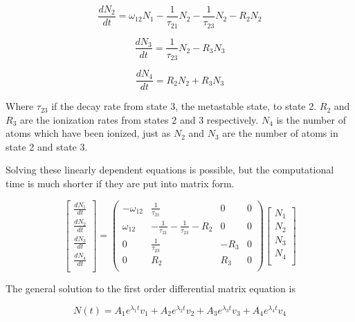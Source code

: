\documentclass[prb,preprint]{revtex4-1}
\begin{document}
\begin{equation}
\label{RateEq2}
\frac{dN_2}{dt} = \omega_{12}N_1 -  \frac{1}{\tau_{21}}N_2 - \frac{1}{\tau_{23}}N_2 - R_2N_2
\end{equation}

\begin{equation}
\label{RateEq3}
\frac{dN_3}{dt} =  \frac{1}{\tau_{23}}N_2 - R_3N_3
\end{equation}

\begin{equation}
\label{RateEq4}
\frac{dN_4}{dt} = R_2N_2 + R_3N_3
\end{equation}

Where $\tau_{23}$ if the decay rate from state 3, the metastable state, to state 2. $R_2$ and $R_3$ are the ionization rates from states 2 and 3 respectively. $N_4$ is the number of atoms which have been ionized, just as $N_2$ and $N_3$ are the number of atoms in state 2 and state 3.

Solving these linearly dependent equations is possible, but the computational time is much shorter if they are put into matrix form.

\begin{equation}
\label{RateEqMatrix}
\begin{bmatrix}
	\frac{dN_1}{dt} \\
	\frac{dN_2}{dt} \\
	\frac{dN_3}{dt} \\
	\frac{dN_4}{dt} \\
\end{bmatrix}
=
\begin{pmatrix}
	-\omega_{12} & \frac{1}{\tau_{21}}  & 0 &  0   \\
	\omega_{12}  & -\frac{1}{\tau_{21}}- \frac{1}{\tau_{23}}-R_2 & 0 & 0 \\
	0  &  \frac{1}{\tau_{23}}  & - R_3 & 0 \\
	0  &  R_2  & R_3 & 0  \\
\end{pmatrix}
\begin{bmatrix}
	N_1 \\
	N_2 \\
	N_3 \\
	N_4 \\
\end{bmatrix}
\end{equation}

The general solution to the first order differential matrix equation is

\begin{equation}
\label{RateEqSol}
N(t) = A_1e^{\lambda_1 t} v_1 + A_2e^{\lambda_2 t} v_2 + A_3e^{\lambda_3 t} v_3 + A_4e^{\lambda_4 t} v_4 
\end{equation}
\end{document}
